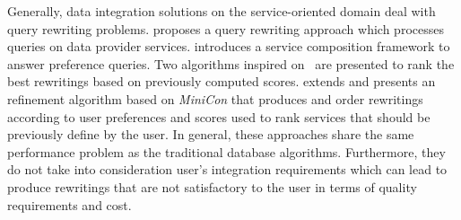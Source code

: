 Generally, data integration solutions on the service-oriented domain deal with
query rewriting problems. \cite{Barhamgi2010} proposes a query rewriting approach which processes queries on data provider services.
%
\cite{Benouaret2011} introduces a service composition framework to answer
preference queries. Two algorithms inspired on~\cite{Barhamgi2010} are presented to rank the best rewritings based on previously computed scores.
%
\cite{ba2014} extends \cite{Umberto} and presents an refinement algorithm based
on \textit{MiniCon} that produces and order rewritings according to user preferences and scores used to rank services that should be previously define by the user.
In general, these approaches share the same performance problem as the traditional database algorithms. Furthermore, they do not take into consideration user's integration requirements which can lead to produce rewritings that are not satisfactory to the user in terms of quality requirements and cost.

%

%


